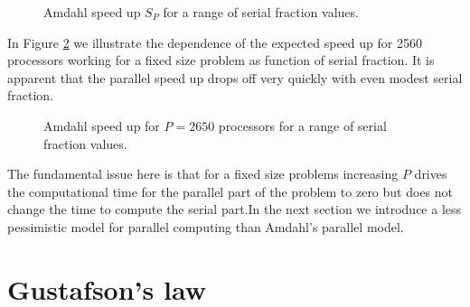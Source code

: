 \begin{figure}[htbp!]
\begin{center}
\end{center}
\caption{Amdahl speed up $S_P$ for a range of serial fraction values.}
\label{amdahl.fig}
\end{figure}

In Figure \ref{amdahl2560.fig} we illustrate the dependence of the expected speed up for 2560 processors working for a fixed size problem as function of serial fraction. It is apparent that the parallel speed up drops off very quickly with even modest serial fraction.
\begin{figure}[htbp!]
\begin{center}
\end{center}
\caption{Amdahl speed up for $P=2650$ processors for a range of serial fraction values.}
\label{amdahl2560.fig}
\end{figure}


The fundamental issue here is that for a fixed size problems increasing $P$ drives the computational time for the parallel part of the problem to zero but does not change the time to compute the serial part.In the next section we introduce a less pessimistic model for parallel computing than Amdahl's parallel model. 

\section{Gustafson's law}

